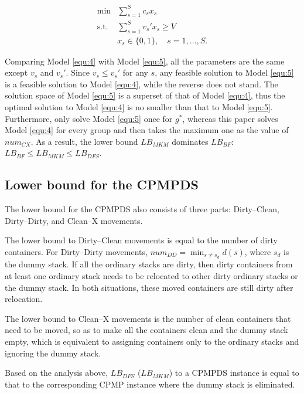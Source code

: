 \documentclass[review,3p,times,authoryear,12pt]{elsarticle}
\begin{document}
\begin{equation}
\label{equ:5}
\begin{array}{rl}
\min & \sum_{s=1}^S c_s x_s\\
\mathrm{s.t.} &\sum_{s=1}^S v_s' x_s\ge V\\
&x_s\in\{0,1\}, \quad s=1,\dots,S\textrm{.}
\end{array}
\end{equation}

Comparing Model \ref{equ:4} with Model \ref{equ:5}, all the parameters are the same except $v_s$ and $v_s'$. 
Since $v_s\le v_s'$ for any $s$, any feasible solution to Model \ref{equ:5} is a feasible solution to Model \ref{equ:4}, while the reverse does not stand. 
The solution space of Model \ref{equ:5} is a superset of that of Model \ref{equ:4}, thus the optimal solution to Model \ref{equ:4} is no smaller than that to Model \ref{equ:5}. 
Furthermore, \cite{BF2012} only solve Model \ref{equ:5} once for $g^*$, whereas this paper solves Model \ref{equ:4} for every group and then takes the maximum one as the value of $\mathit{num}_\mathit{CX}$. 
As a result, the lower bound $\mathit{LB}_\mathit{MKM}$ dominates $\mathit{LB}_\mathit{BF}$: $\mathit{LB}_\mathit{BF}\le \mathit{LB}_\mathit{MKM}\le \mathit{LB}_\mathit{DFS}$.

\subsection{Lower bound for the CPMPDS}


The lower bound for the CPMPDS also consists of three parts: Dirty--Clean, Dirty--Dirty, and Clean--X movements.

The lower bound to Dirty--Clean movements is equal to the number of dirty containers. 
For Dirty--Dirty movements, $\mathit{num}_\mathit{DD}=\min_{s\neq s_d} d(s)$, where $s_d$ is the dummy stack. 
If all the ordinary stacks are dirty, then dirty containers from at least one ordinary stack needs to be relocated to other dirty ordinary stacks or the dummy stack. 
In both situations, these moved containers are still dirty after relocation.

The lower bound to Clean--X movements is the number of clean containers that need to be moved, so as to make all the containers clean and the dummy stack empty, which is equivalent to assigning containers only to the ordinary stacks and ignoring the dummy stack.

Based on the analysis above, $\mathit{LB}_\mathit{DFS}$ ($\mathit{LB}_\mathit{MKM}$) to a CPMPDS instance is equal to that to the corresponding CPMP instance where the dummy stack is eliminated.
\end{document}
